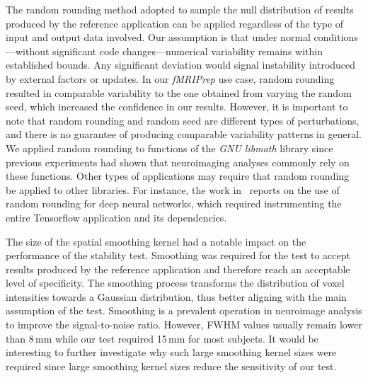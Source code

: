 \documentclass[lettersize,journal]{IEEEtran}
\newcommand{\fmriprep}{\emph{fMRIPrep}\xspace}
\newcommand{\add}[1]{{#1}} %
\begin{document}
The random rounding method adopted to sample the null distribution of results
produced by the reference application can be applied regardless of the type of
input and output data involved. \add{Our assumption is that under normal
  conditions—without significant code changes—numerical variability remains
  within established bounds. Any significant deviation would signal instability
  introduced by external factors or updates.} In our \fmriprep use case, random
rounding resulted in comparable variability to the one obtained from varying
the random seed, which increased the confidence in our results. However, it is
important to note that random rounding and random seed are different types of
perturbations, and there is no guarantee of producing comparable variability
patterns in general. We applied random rounding to functions of the \emph{GNU
  libmath} library since previous experiments had shown that neuroimaging
analyses commonly rely on these functions. Other types of applications may
require that random rounding be applied to other libraries. For instance, the
work in~\cite{gonzalez2024numerical} reports on the use of random rounding for
deep neural networks, which required instrumenting the entire Tensorflow
application and its dependencies.

The size of the spatial smoothing kernel had a notable impact on the
performance of the stability test. Smoothing was required for the test to
accept results produced by the reference application and therefore reach an
acceptable level of specificity. The smoothing process transforms the
distribution of voxel intensities towards a Gaussian distribution, thus better
aligning with the main assumption of the test. Smoothing is a prevalent
operation in neuroimage analysis to improve the signal-to-noise ratio. However,
FWHM values usually remain lower than 8\,mm while our test required 15\,mm for
most subjects. It would be interesting to further investigate why such large
smoothing kernel sizes were required since large smoothing kernel sizes reduce
the sensitivity of our test.
\end{document}
